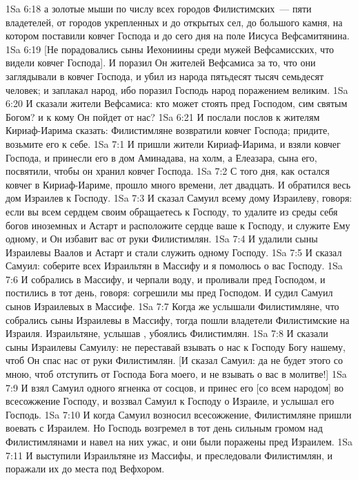 \vs 1Sa 6:18 а золотые мыши  по числу всех городов Филистимских~--- пяти владетелей, от городов укрепленных и до открытых сел, до большого камня, на котором поставили ковчег Господа и  до сего дня на поле Иисуса Вефсамитянина.
\vs 1Sa 6:19 [Не порадовались сыны Иехониины среди мужей Вефсамисских, что видели ковчег Господа]. И поразил Он жителей Вефсамиса за то, что они заглядывали в ковчег Господа, и убил из народа пятьдесят тысяч семьдесят человек; и заплакал народ, ибо поразил Господь народ поражением великим.
\vs 1Sa 6:20 И сказали жители Вефсамиса: кто может стоять пред Господом, сим святым Богом? и к кому Он пойдет от нас?
\vs 1Sa 6:21 И послали послов к жителям Кириаф-Иарима сказать: Филистимляне возвратили ковчег Господа; придите, возьмите его к себе.
\vs 1Sa 7:1 И пришли жители Кириаф-Иарима, и взяли ковчег Господа, и принесли его в дом Аминадава, на холм, а Елеазара, сына его, посвятили, чтобы он хранил ковчег Господа.
\vs 1Sa 7:2 С того дня, как остался ковчег в Кириаф-Иариме, прошло много времени, лет двадцать. И обратился весь дом Израилев к Господу.
\vs 1Sa 7:3 И сказал Самуил всему дому Израилеву, говоря: если вы всем сердцем своим обращаетесь к Господу, то удалите из среды себя богов иноземных и Астарт и расположите сердце ваше к Господу, и служите Ему одному, и Он избавит вас от руки Филистимлян.
\vs 1Sa 7:4 И удалили сыны Израилевы Ваалов и Астарт и стали служить одному Господу.
\vs 1Sa 7:5 И сказал Самуил: соберите всех Израильтян в Массифу и я помолюсь о вас Господу.
\vs 1Sa 7:6 И собрались в Массифу, и черпали воду, и проливали пред Господом, и постились в тот день, говоря: согрешили мы пред Господом. И судил Самуил сынов Израилевых в Массифе.
\vs 1Sa 7:7 Когда же услышали Филистимляне, что собрались сыны Израилевы в Массифу, тогда пошли владетели Филистимские на Израиля. Израильтяне, услышав , убоялись Филистимлян.
\vs 1Sa 7:8 И сказали сыны Израилевы Самуилу: не переставай взывать о нас к Господу Богу нашему, чтоб Он спас нас от руки Филистимлян. [И сказал Самуил: да не будет этого со мною, чтоб отступить от Господа Бога моего, и не взывать о вас в молитве!]
\vs 1Sa 7:9 И взял Самуил одного ягненка от сосцов, и принес его [со всем народом] во всесожжение Господу, и воззвал Самуил к Господу о Израиле, и услышал его Господь.
\vs 1Sa 7:10 И когда Самуил возносил всесожжение, Филистимляне пришли воевать с Израилем. Но Господь возгремел в тот день сильным громом над Филистимлянами и навел на них ужас, и они были поражены пред Израилем.
\vs 1Sa 7:11 И выступили Израильтяне из Массифы, и преследовали Филистимлян, и поражали их до места под Вефхором.
